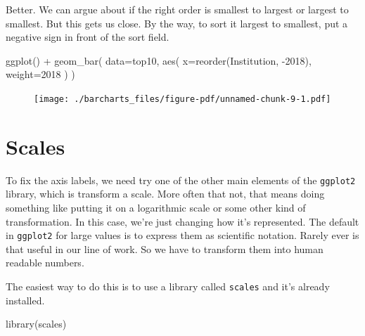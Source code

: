 \documentclass[
  letterpaper,
  DIV=11,
  numbers=noendperiod]{scrreprt}
\newenvironment{Shaded}{\begin{snugshade}}{\end{snugshade}}
\newcommand{\AttributeTok}[1]{\textcolor[rgb]{0.40,0.45,0.13}{#1}}
\newcommand{\FunctionTok}[1]{\textcolor[rgb]{0.28,0.35,0.67}{#1}}
\newcommand{\NormalTok}[1]{\textcolor[rgb]{0.00,0.23,0.31}{#1}}
\newcommand{\SpecialCharTok}[1]{\textcolor[rgb]{0.37,0.37,0.37}{#1}}
\newcommand{\StringTok}[1]{\textcolor[rgb]{0.13,0.47,0.30}{#1}}
\begin{document}
Better. We can argue about if the right order is smallest to largest or
largest to smallest. But this gets us close. By the way, to sort it
largest to smallest, put a negative sign in front of the sort field.

\begin{Shaded}
\begin{Highlighting}[]
\FunctionTok{ggplot}\NormalTok{() }\SpecialCharTok{+} 
  \FunctionTok{geom\_bar}\NormalTok{(}
    \AttributeTok{data=}\NormalTok{top10, }
    \FunctionTok{aes}\NormalTok{(}
      \AttributeTok{x=}\FunctionTok{reorder}\NormalTok{(Institution, }\SpecialCharTok{{-}}\StringTok{\textasciigrave{}}\AttributeTok{2018}\StringTok{\textasciigrave{}}\NormalTok{), }
      \AttributeTok{weight=}\StringTok{\textasciigrave{}}\AttributeTok{2018}\StringTok{\textasciigrave{}}
\NormalTok{      )}
\NormalTok{    )}
\end{Highlighting}
\end{Shaded}

\begin{figure}[H]

{\centering \texttt{[image: ./barcharts\_files/figure-pdf/unnamed-chunk-9-1.pdf]}

}

\end{figure}

\hypertarget{scales}{%
\section{Scales}\label{scales}}

To fix the axis labels, we need try one of the other main elements of
the \texttt{ggplot2} library, which is transform a scale. More often
that not, that means doing something like putting it on a logarithmic
scale or some other kind of transformation. In this case, we're just
changing how it's represented. The default in \texttt{ggplot2} for large
values is to express them as scientific notation. Rarely ever is that
useful in our line of work. So we have to transform them into human
readable numbers.

The easiest way to do this is to use a library called \texttt{scales}
and it's already installed.

\begin{Shaded}
\begin{Highlighting}[]
\FunctionTok{library}\NormalTok{(scales)}
\end{Highlighting}
\end{Shaded}
\end{document}
